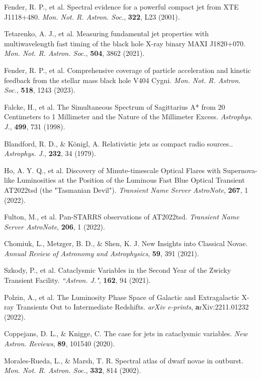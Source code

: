 \documentclass{nature_plusfigure}
\newcommand{\mn}{{Mon. Not. R. Astron. Soc.}}
\newcommand{\nar}{{New Astron. Reviews}}
\newcommand{\mnras}{\mn}
\newcommand{\aj}{{``Astron. J."}}
\newcommand{\apj}{{Astrophys. J.}}
\newcommand{\araa}{Annual Review of Astronomy and Astrophysics}
\begin{document}
\begin{methods}
\begin{thebibliography}{10}
 Fender, R. P., et al. Spectral evidence for a powerful compact jet from XTE J1118+480. \emph{\mnras}, \textbf{322}, L23 (2001).

 Tetarenko, A. J., et al. Measuring fundamental jet properties with multiwavelength fast timing of the black hole X-ray binary MAXI J1820+070. \emph{\mnras}, \textbf{504}, 3862 (2021).  

  Fender, R. P., et al. Comprehensive coverage of particle acceleration and kinetic feedback from the stellar mass black hole V404 Cygni. \emph{\mnras}, \textbf{518}, 1243 (2023). 
 
  Falcke, H., et al. The Simultaneous Spectrum of Sagittarius A* from 20 Centimeters to 1 Millimeter and the Nature of the Millimeter Excess. \emph{\apj}, \textbf{499}, 731 (1998). 

  Blandford, R. D., \& Königl, A. Relativistic jets as compact radio sources.. \emph{\apj}, \textbf{232}, 34 (1979). 


 Ho, A. Y. Q., et al. Discovery of Minute-timescale Optical Flares with Supernova-like Luminosities at the Position of the Luminous Fast Blue Optical Transient AT2022tsd (the "Tasmanian Devil"). \emph{Transient Name Server AstroNote}, \textbf{267}, 1 (2022). 

 Fulton, M., et al. Pan-STARRS observations of AT2022tsd. \emph{Transient Name Server AstroNote}, \textbf{206}, 1 (2022). 

 Chomiuk, L., Metzger, B. D., \& Shen, K. J. New Insights into Classical Novae. \emph{\araa}, \textbf{59}, 391 (2021). 

 Szkody, P., et al. Cataclysmic Variables in the Second Year of the Zwicky Transient Facility. \emph{\aj}, \textbf{162}, 94 (2021). 

 Polzin, A., et al. The Luminosity Phase Space of Galactic and Extragalactic X-ray Transients Out to Intermediate Redshifts. \emph{arXiv e-prints}, \textbf arXiv:2211.01232 (2022). 

 Coppejans, D. L., \& Knigge, C. The case for jets in cataclysmic variables. \emph{\nar}, \textbf{89}, 101540 (2020). 

 Morales-Rueda, L., \& Marsh, T. R. Spectral atlas of dwarf novae in outburst. \emph{\mnras}, \textbf{332}, 814 (2002). 


\end{thebibliography}
\end{methods}
\end{document}
